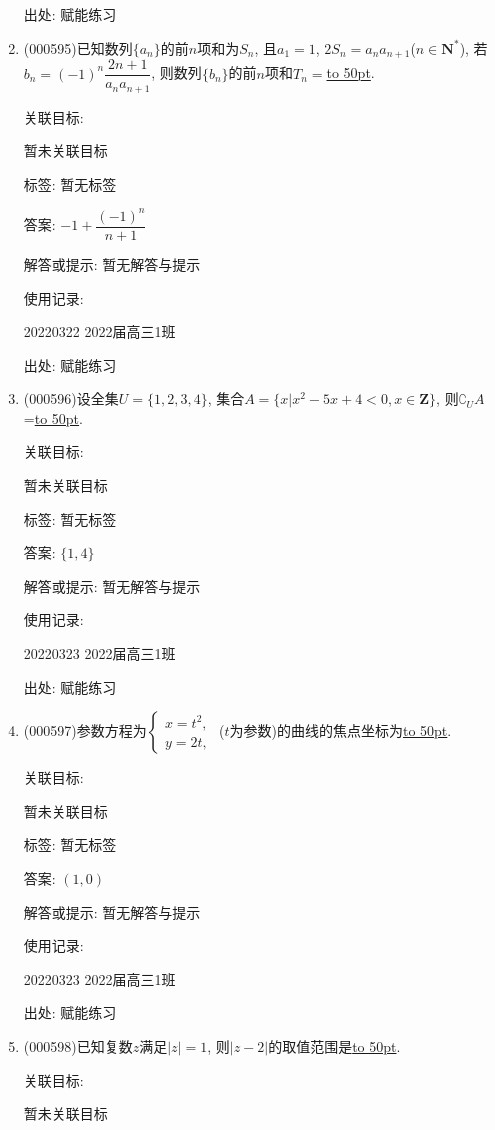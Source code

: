 \documentclass[10pt,a4paper]{article}
\newcommand{\blank}[1]{\underline{\hbox to #1pt{}}}
\begin{document}
\begin{enumerate}[1.]
出处: 赋能练习
\item { (000595)}已知数列$\{a_n\}$的前$n$项和为$S_n$, 且$a_1=1$, $2S_n=a_na_{n+1}$($n\in \mathbf{N}^*$), 若$b_n=(-1)^n\dfrac{2n+1}{{a_n}{a_{n+1}}}$, 则数列$\{b_n\}$的前$n$项和$T_n=$\blank{50}.


关联目标:

暂未关联目标



标签: 暂无标签

答案: $-1+\dfrac{{(-1)}^n}{n+1}$

解答或提示: 暂无解答与提示

使用记录:

20220322	2022届高三1班	


出处: 赋能练习
\item { (000596)}设全集$U=\{1,2,3,4\}$, 集合$A=\{x|x^2-5x+4<0,x\in \mathbf{Z}\}$, 则$\complement_U A$=\blank{50}.


关联目标:

暂未关联目标



标签: 暂无标签

答案: $\{1,4\}$

解答或提示: 暂无解答与提示

使用记录:

20220323	2022届高三1班	


出处: 赋能练习
\item { (000597)}参数方程为$\begin{cases} x=t^2, \\ y=2t, \end{cases}$ ($t$为参数)的曲线的焦点坐标为\blank{50}.


关联目标:

暂未关联目标



标签: 暂无标签

答案: $(1,0)$

解答或提示: 暂无解答与提示

使用记录:

20220323	2022届高三1班	


出处: 赋能练习
\item { (000598)}已知复数$z$满足$|z|=1$, 则$|z-2|$的取值范围是\blank{50}.


关联目标:

暂未关联目标




\end{enumerate}
\end{document}
